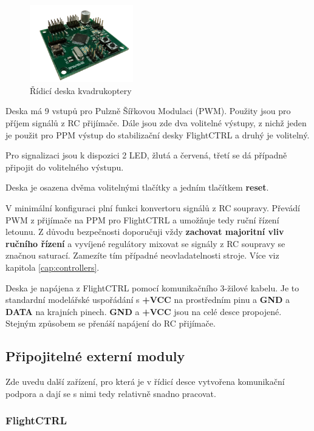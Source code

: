 \documentclass[11pt, a4paper]{article}
\begin{document}
\begin{figure}[h]
\begin{center}
\includegraphics[width=0.4\textwidth]{fig/control_board.jpg}
\caption{Řídicí deska kvadrukoptery}
\label{fig:flightctrl}
\end{center}
\end{figure}

Deska má 9 vstupů pro Pulzně Šířkovou Modulaci (PWM). Použity jsou pro příjem signálů z RC přijímače. Dále jsou zde dva volitelné výstupy, z nichž jeden je použit pro PPM výstup do stabilizační desky FlightCTRL a druhý je volitelný.

Pro signalizaci jsou k dispozici 2 LED, žlutá a červená, třetí se dá případně připojit do volitelného výstupu.

Deska je osazena dvěma volitelnými tlačítky a jedním tlačítkem \textbf{reset}.

V minimální konfiguraci plní funkci konvertoru signálů z RC soupravy. Převádí PWM z přijímače na PPM pro FlightCTRL a umožňuje tedy ruční řízení letounu. Z důvodu bezpečnosti doporučuji vždy \textbf{zachovat majoritní vliv ručního řízení} a vyvíjené regulátory mixovat se signály z RC soupravy se značnou saturací. Zamezíte tím případné neovladatelnosti stroje. Více viz kapitola \ref{cap:controllers}.

Deska je napájena z FlightCTRL pomocí komunikačního 3-žilové kabelu. Je to standardní modelářské uspořádání s \textbf{+VCC} na prostředním pinu a \textbf{GND} a \textbf{DATA} na krajních pinech. \textbf{GND} a \textbf{+VCC} jsou na celé desce propojené. Stejným způsobem se přenáší napájení do RC přijímače. 

\subsection{Připojitelné externí moduly}

Zde uvedu další zařízení, pro která je v řídicí desce vytvořena komunikační podpora a dají se s nimi tedy relativně snadno pracovat.

\subsubsection{FlightCTRL}
\end{document}
